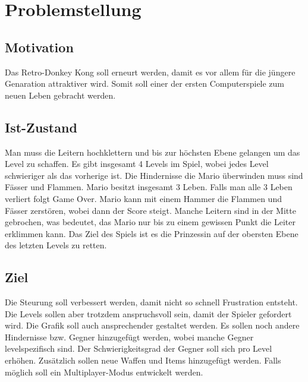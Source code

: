 \documentclass[12pt]{article}
\begin{document}
\maketitle

\newpage

\tableofcontents

\newpage


\section{Problemstellung}

\subsection{Motivation}
Das Retro-Donkey Kong soll erneurt werden, damit es vor allem für die jüngere Genaration attraktiver wird.
Somit soll einer der ersten Computerspiele zum neuen Leben gebracht werden.

\subsection{Ist-Zustand}
Man muss die Leitern hochklettern und bis zur höchsten Ebene gelangen um das Level zu schaffen. Es gibt insgesamt
4 Levels im Spiel, wobei jedes Level schwieriger als das vorherige ist. Die Hindernisse die Mario überwinden muss sind Fässer und Flammen.
Mario besitzt insgesamt 3 Leben. Falls man alle 3 Leben verliert folgt Game Over. Mario kann mit einem Hammer die Flammen und Fässer 
zerstören, wobei dann der Score steigt. Manche Leitern sind in der Mitte gebrochen, was bedeutet, das Mario nur bis zu einem gewissen Punkt
die Leiter erklimmen kann. Das Ziel des Spiels ist es die Prinzessin auf der obersten Ebene des letzten Levels zu retten.

\subsection{Ziel}
Die Steurung soll verbessert werden, damit nicht so schnell Frustration entsteht. 
Die Levels sollen aber trotzdem anspruchsvoll sein, damit der Spieler gefordert wird. Die Grafik soll auch ansprechender gestaltet werden.
Es sollen noch andere Hindernisse bzw. Gegner hinzugefügt werden, wobei manche Gegner levelspezifisch sind. 
Der Schwierigkeitsgrad der Gegner soll sich pro Level erhöhen.
Zusätzlich sollen neue Waffen und Items hinzugefügt werden.
Falls möglich soll ein Multiplayer-Modus entwickelt werden.
\end{document}
